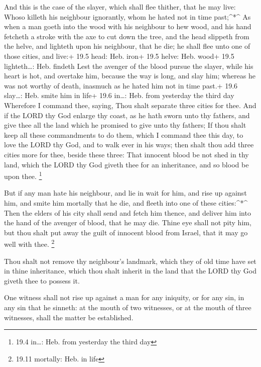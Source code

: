  And this is the case of the slayer, which shall flee
thither, that he may live: Whoso killeth his neighbour ignorantly, whom
he hated not in time past;\^{}*\^{}  As when a man goeth
into the wood with his neighbour to hew wood, and his hand fetcheth a
stroke with the axe to cut down the tree, and the head slippeth from the
helve, and lighteth upon his neighbour, that he die; he shall flee unto
one of those cities, and live:+ 19.5 head: Heb. iron+ 19.5 helve: Heb.
wood+ 19.5 lighteth\ldots: Heb. findeth  Lest the avenger of
the blood pursue the slayer, while his heart is hot, and overtake him,
because the way is long, and slay him; whereas he was not worthy of
death, inasmuch as he hated him not in time past.+ 19.6 slay\ldots: Heb.
smite him in life+ 19.6 in\ldots: Heb. from yesterday the third day
 Wherefore I command thee, saying, Thou shalt separate three
cities for thee.  And if the LORD thy God enlarge thy coast,
as he hath sworn unto thy fathers, and give thee all the land which he
promised to give unto thy fathers;  If thou shalt keep all
these commandments to do them, which I command thee this day, to love
the LORD thy God, and to walk ever in his ways; then shalt thou add
three cities more for thee, beside these three:  That
innocent blood be not shed in thy land, which the LORD thy God giveth
thee for an inheritance, and so blood be upon thee. \footnote{19.4
  in\ldots: Heb. from yesterday the third day}

 But if any man hate his neighbour, and lie in wait for
him, and rise up against him, and smite him mortally that he die, and
fleeth into one of these cities:\^{}*\^{}  Then the elders
of his city shall send and fetch him thence, and deliver him into the
hand of the avenger of blood, that he may die.  Thine eye
shall not pity him, but thou shalt put away the guilt of innocent blood
from Israel, that it may go well with thee. \footnote{19.11 mortally:
  Heb. in life}

 Thou shalt not remove thy neighbour's landmark, which they
of old time have set in thine inheritance, which thou shalt inherit in
the land that the LORD thy God giveth thee to possess it.

 One witness shall not rise up against a man for any
iniquity, or for any sin, in any sin that he sinneth: at the mouth of
two witnesses, or at the mouth of three witnesses, shall the matter be
established.

